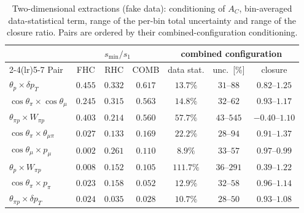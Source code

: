 \begin{table}[H]
  \centering
  \caption{Two-dimensional extractions (fake data): conditioning of $A_C$, bin-averaged
    data-statistical term, range of the per-bin total uncertainty and range of the closure ratio.
    Pairs are ordered by their combined-configuration conditioning.}
  \label{tab:2dextract}
  \small
  \begin{tabular}{lcccccc}
    \toprule
    & \multicolumn{3}{c}{$s_{\min}/s_1$} & \multicolumn{3}{c}{combined configuration} \\
    \cmidrule(lr){2-4}\cmidrule(lr){5-7}
    Pair & FHC & RHC & COMB & data stat. & unc.\ [\%] & closure \\
    \midrule
    $\theta_p\times\delta p_T$ & $0.455$ & $0.332$ & $\mathbf{0.617}$ & $13.7\%$ & $31$--$88$ & $0.82$--$1.25$ \\
    $\cos\theta_\pi\times\cos\theta_\mu$ & $0.245$ & $0.315$ & $\mathbf{0.563}$ & $14.8\%$ & $32$--$62$ & $0.93$--$1.17$ \\
    $\theta_{\pi p}\times W_{\pi p}$ & $0.403$ & $0.214$ & $0.560$ & $57.7\%$ & $43$--$545$ & $-0.40$--$1.10$ \\
    $\cos\theta_\pi\times\theta_{\mu\pi}$ & $0.027$ & $0.133$ & $0.169$ & $22.2\%$ & $28$--$94$ & $0.91$--$1.37$ \\
    $\cos\theta_\mu\times p_\mu$ & $0.002$ & $0.261$ & $0.110$ & $8.9\%$ & $33$--$57$ & $0.97$--$0.99$ \\
    $\theta_p\times W_{\pi p}$ & $0.008$ & $0.152$ & $0.105$ & $111.7\%$ & $36$--$291$ & $0.39$--$1.22$ \\
    $\cos\theta_\pi\times p_\pi$ & $0.023$ & $0.158$ & $0.052$ & $12.9\%$ & $32$--$58$ & $0.96$--$1.14$ \\
    $\theta_{\pi p}\times\delta p_T$ & $0.024$ & $0.035$ & $0.028$ & $10.7\%$ & $28$--$50$ & $0.93$--$1.08$ \\
    \bottomrule
  \end{tabular}
\end{table}

